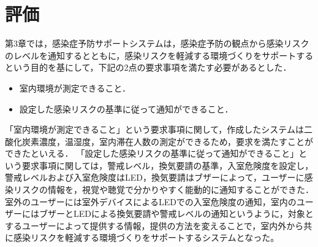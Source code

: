 
\section{評価}

第3章では，感染症予防サポートシステムは，感染症予防の観点から感染リスクのレベルを通知するとともに，感染リスクを軽減する環境づくりをサポートするという目的を基にして，下記の2点の要求事項を満たす必要があるとした．

\begin{itemize}
	\item 室内環境が測定できること．
	\item 設定した感染リスクの基準に従って通知ができること．
\end{itemize}

「室内環境が測定できること」という要求事項に関して，作成したシステムは二酸化炭素濃度，温湿度，室内滞在人数の測定ができるため，要求を満たすことができたといえる．
「設定した感染リスクの基準に従って通知ができること」という要求事項に関しては，警戒レベル，換気要請の基準，入室危険度を設定し，警戒レベルおよび入室危険度はLED，換気要請はブザーによって，ユーザーに感染リスクの情報を，視覚や聴覚で分かりやすく能動的に通知することができた．室外のユーザーには室外デバイスによるLEDでの入室危険度の通知，室内のユーザーにはブザーとLEDによる換気要請や警戒レベルの通知というように，対象とするユーザーによって提供する情報，提供の方法を変えることで，室内外から共に感染リスクを軽減する環境づくりをサポートするシステムとなった。